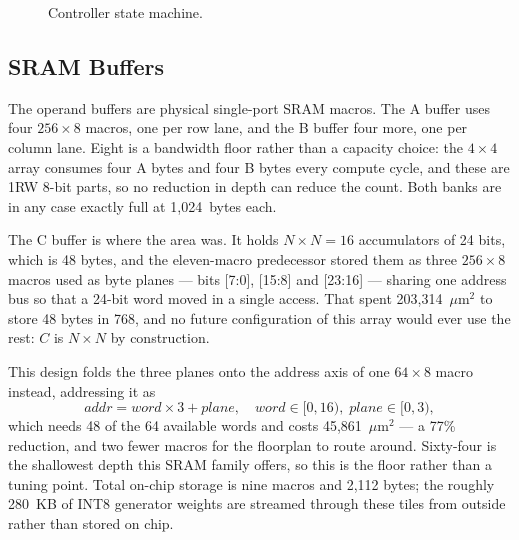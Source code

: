 \documentclass[conference,a4paper]{APSIPA2026}
\begin{document}
\begin{figure}[!ht]
\centering
{}
\caption{Controller state machine.}
\label{fig:fsm}
\end{figure}

\subsection{SRAM Buffers}
The operand buffers are physical single-port SRAM macros. The A buffer uses four $256\times8$ macros, one per row lane, and the B buffer four more, one per column lane. Eight is a bandwidth floor rather than a capacity choice: the $4\times4$ array consumes four A bytes and four B bytes every compute cycle, and these are 1RW 8-bit parts, so no reduction in depth can reduce the count. Both banks are in any case exactly full at 1{,}024~bytes each.

The C buffer is where the area was. It holds $N\times N=16$ accumulators of 24 bits, which is 48 bytes, and the eleven-macro predecessor stored them as three $256\times8$ macros used as byte planes --- bits [7:0], [15:8] and [23:16] --- sharing one address bus so that a 24-bit word moved in a single access. That spent 203{,}314~$\mu$m$^2$ to store 48 bytes in 768, and no future configuration of this array would ever use the rest: $C$ is $N\times N$ by construction.

This design folds the three planes onto the address axis of one $64\times8$ macro instead, addressing it as
\begin{equation}
\mathit{addr} = \mathit{word}\times 3 + \mathit{plane}, \quad \mathit{word}\in[0,16), \; \mathit{plane}\in[0,3),
\end{equation}
which needs 48 of the 64 available words and costs 45{,}861~$\mu$m$^2$ --- a 77\% reduction, and two fewer macros for the floorplan to route around. Sixty-four is the shallowest depth this SRAM family offers, so this is the floor rather than a tuning point. Total on-chip storage is nine macros and 2{,}112 bytes; the roughly 280~KB of INT8 generator weights are streamed through these tiles from outside rather than stored on chip.
\end{document}
